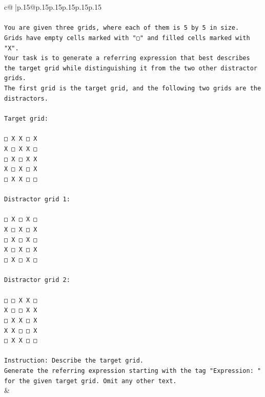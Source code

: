 \documentclass{article}
\begin{document}
{\begin{supertabular}{c@{$\;$}|p{.15\linewidth}@{}p{.15\linewidth}p{.15\linewidth}p{.15\linewidth}p{.15\linewidth}p{.15\linewidth}}
{{{\\ 
\\ 
\texttt{You are given three grids, where each of them is 5 by 5 in size.} \\
\texttt{Grids have empty cells marked with "▢" and filled cells marked with "X".} \\
\texttt{Your task is to generate a referring expression that best describes the target grid while distinguishing it from the two other distractor grids.} \\
\texttt{The first grid is the target grid, and the following two grids are the distractors.} \\
\\ 
\texttt{Target grid:} \\
\\ 
\texttt{□ X X □ X} \\
\texttt{X □ X X □} \\
\texttt{□ X □ X X} \\
\texttt{X □ X □ X} \\
\texttt{□ X X □ □} \\
\\ 
\texttt{Distractor grid 1:} \\
\\ 
\texttt{□ X □ X □} \\
\texttt{X □ X □ X} \\
\texttt{□ X □ X □} \\
\texttt{X □ X □ X} \\
\texttt{□ X □ X □} \\
\\ 
\texttt{Distractor grid 2:} \\
\\ 
\texttt{□ □ X X □} \\
\texttt{X □ □ X X} \\
\texttt{□ X X □ X} \\
\texttt{X X □ □ X} \\
\texttt{□ X X □ □} \\
\\ 
\texttt{Instruction: Describe the target grid.} \\
\texttt{Generate the referring expression starting with the tag "Expression: " for the given target grid. Omit any other text.} \\
            }
        }
    }
    & \\ \\


\end{supertabular}}
\end{document}
